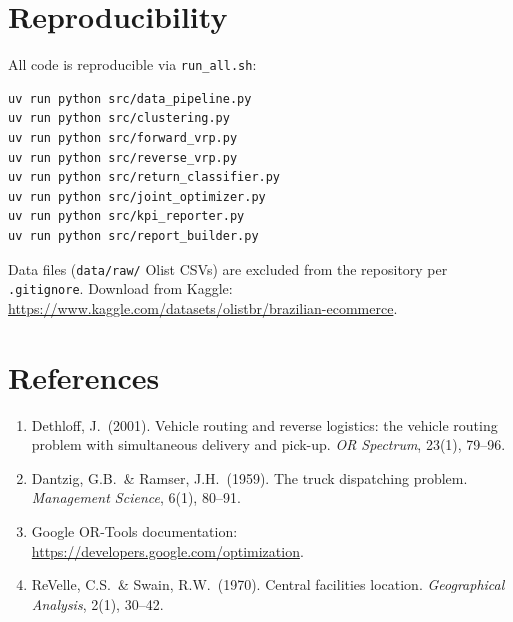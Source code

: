 \documentclass[11pt,a4paper]{article}
\begin{document}
\section{Reproducibility}

All code is reproducible via \texttt{run\_all.sh}:
\begin{verbatim}
uv run python src/data_pipeline.py
uv run python src/clustering.py
uv run python src/forward_vrp.py
uv run python src/reverse_vrp.py
uv run python src/return_classifier.py
uv run python src/joint_optimizer.py
uv run python src/kpi_reporter.py
uv run python src/report_builder.py
\end{verbatim}

Data files (\texttt{data/raw/} Olist CSVs) are excluded from the repository
per \texttt{.gitignore}.  Download from Kaggle:
\url{https://www.kaggle.com/datasets/olistbr/brazilian-ecommerce}.

\section*{References}

\begin{enumerate}[noitemsep]
  \item Dethloff, J.\ (2001). Vehicle routing and reverse logistics:
        the vehicle routing problem with simultaneous delivery and pick-up.
        \textit{OR Spectrum}, 23(1), 79--96.
  \item Dantzig, G.B.\ \& Ramser, J.H.\ (1959). The truck dispatching problem.
        \textit{Management Science}, 6(1), 80--91.
  \item Google OR-Tools documentation:
        \url{https://developers.google.com/optimization}.
  \item ReVelle, C.S.\ \& Swain, R.W.\ (1970). Central facilities location.
        \textit{Geographical Analysis}, 2(1), 30--42.
\end{enumerate}
\end{document}
